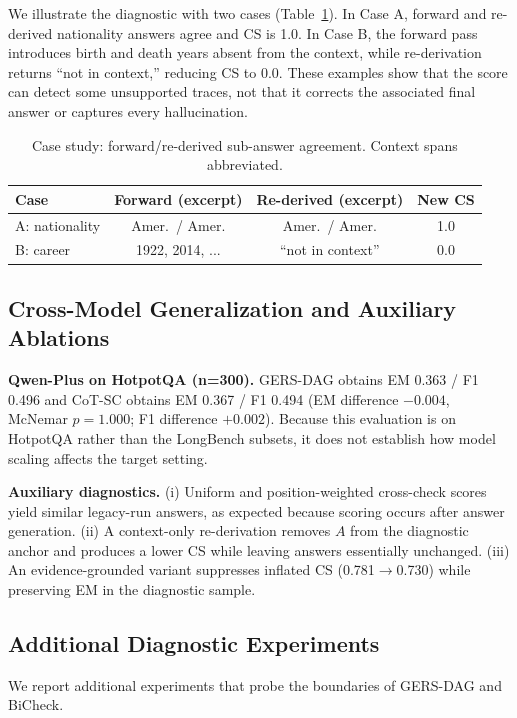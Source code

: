 \documentclass[letterpaper]{article} %
\begin{document}
We illustrate the diagnostic with two cases (Table~\ref{tab:case}). In Case A, forward and re-derived nationality answers agree and CS is 1.0. In Case B, the forward pass introduces birth and death years absent from the context, while re-derivation returns ``not in context,'' reducing CS to 0.0. These examples show that the score can detect some unsupported traces, not that it corrects the associated final answer or captures every hallucination.

\begin{table}[t]
\centering
\caption{Case study: forward/re-derived sub-answer agreement. Context spans abbreviated.}
\label{tab:case}
\small
\begin{tabular}{lccc}
\toprule
Case & Forward (excerpt) & Re-derived (excerpt) & New CS \\
\midrule
A: nationality & Amer.\ / Amer. & Amer.\ / Amer. & 1.0 \\
B: career & 1922, 2014, ... & ``not in context'' & 0.0 \\
\bottomrule
\end{tabular}
\end{table}

\subsection{Cross-Model Generalization and Auxiliary Ablations}

\noindent\textbf{Qwen-Plus on HotpotQA (n=300).} GERS-DAG obtains EM 0.363 / F1 0.496 and CoT-SC obtains EM 0.367 / F1 0.494 (EM difference $-0.004$, McNemar $p{=}1.000$; F1 difference $+0.002$). Because this evaluation is on HotpotQA rather than the LongBench subsets, it does not establish how model scaling affects the target setting.

\noindent\textbf{Auxiliary diagnostics.} (i) Uniform and position-weighted cross-check scores yield similar legacy-run answers, as expected because scoring occurs after answer generation. (ii) A context-only re-derivation removes $A$ from the diagnostic anchor and produces a lower CS while leaving answers essentially unchanged. (iii) An evidence-grounded variant suppresses inflated CS (0.781$\to$0.730) while preserving EM in the diagnostic sample.

\subsection{Additional Diagnostic Experiments}

We report additional experiments that probe the boundaries of GERS-DAG and BiCheck.
\end{document}
